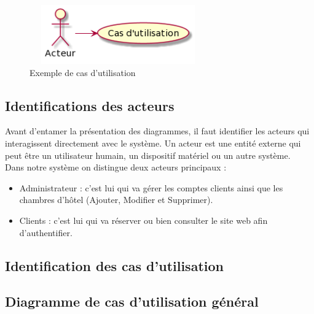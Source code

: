 \documentclass[12pt]{report}
\begin{document}
\vspace{0.2in}

\begin{figure}[h]
\centering
    \includegraphics[width = 3.0in, height = 1.0in]{../images/usecaseEG.png}
    \caption{Exemple de cas d'utilisation}
\end{figure}

\subsection{Identifications des acteurs}

Avant d’entamer la présentation des diagrammes, il faut identifier les acteurs qui interagissent directement avec le système. Un acteur est une entité externe qui peut être un utilisateur humain, un dispositif matériel ou un autre système.
\\
Dans notre système on distingue deux acteurs principaux :

\begin{itemize}
    \item Administrateur : c’est lui qui va gérer les comptes clients ainsi que les chambres d’hôtel (Ajouter, Modifier et Supprimer).
    \item Clients : c'est lui qui va réserver ou bien consulter le site web afin d'authentifier.
\end{itemize}

\subsection{Identification des cas d’utilisation}
\subsection{Diagramme de cas d’utilisation général}

\newpage
\end{document}
